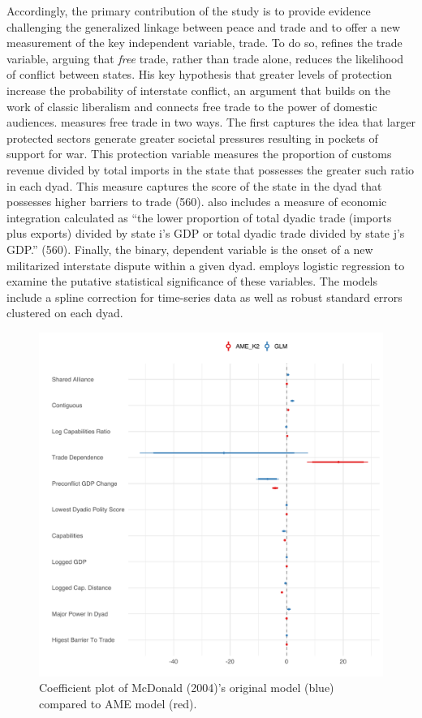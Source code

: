 Accordingly, the primary contribution of the study is to provide evidence challenging the generalized linkage between peace and trade and to offer a new measurement of the key independent variable, trade. To do so, \citet{mcdonald:2004} refines the trade variable, arguing that \textit{free} trade, rather than trade alone, reduces the likelihood of conflict between states. His key hypothesis that greater levels of protection increase the probability of interstate conflict, an argument that builds on the work of classic liberalism and connects free trade to the power of domestic audiences. \citet{mcdonald:2004} measures free trade in two ways. The first  captures the idea that larger protected sectors generate greater societal pressures resulting in  pockets of support for war. This protection variable measures the proportion of customs revenue divided by total imports in the state that possesses the greater such ratio in each dyad. This measure captures the score of the state in the dyad that possesses higher barriers to trade (560). \citet{mcdonald:2004} also includes a measure of economic integration  calculated as ``the lower proportion of total dyadic trade (imports plus exports) divided by state i's GDP or total dyadic trade divided by state j's GDP.'' (560). Finally, the binary, dependent variable is the onset of a new militarized interstate dispute within a given dyad. \citet{mcdonald:2004} employs logistic regression to examine the putative statistical significance of these variables. The models include a spline correction for time-series data as well as robust standard errors clustered on each dyad.

\begin{figure}
\includegraphics[width=\textwidth]{McDonald_coefs.pdf}
\caption{\label{fig:mcdCoefs}Coefficient plot of McDonald (2004)'s original model (blue) compared to AME model (red).}
\end{figure}

